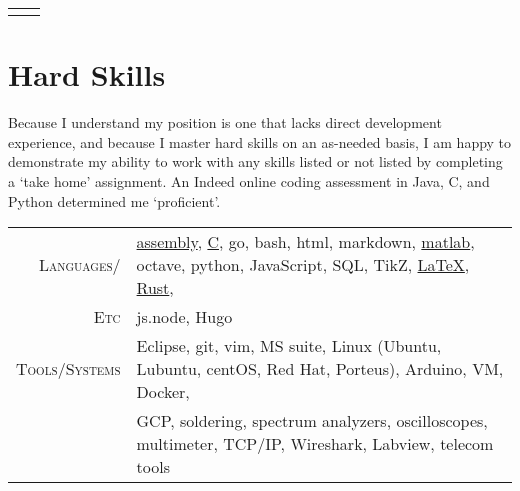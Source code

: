 \documentclass[letter,11pt]{article}
\begin{document}
\begin{center}
{\begin{tabular}{r|l}
\addlinespace[12pt]

\end{tabular}
}

\vspace{-6pt}

\section{Hard Skills}
\vspace{-4pt}
\end{center}

\footnotesize{
\noindent Because I understand my position is one that lacks direct development experience, and because I master hard skills on an as-needed basis, I am happy to demonstrate my ability to work with any skills listed or not listed by completing a `take home' assignment. An Indeed online coding assessment in Java, C, and Python determined me `proficient'.\\

\vspace{-2pt}

\hspace{-28pt} %
\begin{tabular}{r|l}

		\textsc{Languages/}
	&	\scriptsize{\href{https://github.com/blairmunroakusa/portfolio/tree/master/miscellaneous/assemblySample}{assembly}, 
				\href{https://github.com/blairmunroakusa/portfolio/tree/master/_DUMP/C}{C}, go, bash, html, markdown, 
				\href{https://github.com/blairmunroakusa/portfolio/tree/master/miscellaneous/seniorDesign}{matlab}, octave, python, JavaScript, SQL, TikZ, 					\href{https://github.com/blairmunroakusa/portfolio/tree/master/miscellaneous/XeLaTeX_resume}{\LaTeX}, 
				\href{https://github.com/blairmunroakusaLEAF/cellularautomata_1d}{Rust},}
	\\
		\textsc{Etc}
	&	\scriptsize{js.node, Hugo}
	\\

\addlinespace[8pt]
	
		\textsc{Tools/Systems}
	&	\scriptsize{Eclipse, git, vim, MS suite, Linux (Ubuntu, Lubuntu, centOS, Red Hat, Porteus), Arduino, VM, Docker, } 
	\\
		
	&	\scriptsize{GCP, soldering, spectrum analyzers, oscilloscopes, multimeter, TCP/IP, Wireshark, Labview, telecom tools}
	\\
	
\end{tabular}

}
\end{document}
